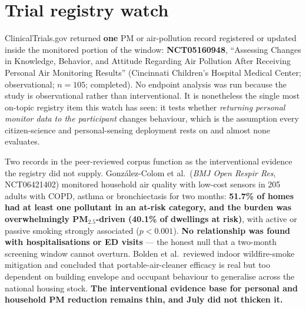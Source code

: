 \documentclass[10pt]{article}
\begin{document}
\clearpage

\section*{\sffamily\bfseries\color{Deep}Trial registry watch}
\vspace{-1.5mm}{\color{Coral}\rule{\linewidth}{1.1pt}}\vspace{2.5mm}

\footnotesize
ClinicalTrials.gov returned \textbf{one} PM or air-pollution record registered or
updated inside the monitored portion of the window: \textbf{NCT05160948}, ``Assessing
Changes in Knowledge, Behavior, and Attitude Regarding Air Pollution After Receiving
Personal Air Monitoring Results'' (Cincinnati Children's Hospital Medical Center;
observational; $n = 105$; completed). No endpoint analysis was run because the study is
observational rather than interventional. It is nonetheless the single most
on-topic registry item this watch has seen: it tests whether \emph{returning personal
monitor data to the participant} changes behaviour, which is the assumption every
citizen-science and personal-sensing deployment rests on and almost none evaluates.

\vspace{1.5mm}
Two records in the peer-reviewed corpus function as the interventional evidence the
registry did not supply. Gonz\'alez-Colom et al.\ (\textit{BMJ Open Respir Res},
NCT06421402) monitored household air quality with low-cost sensors in 205 adults with
COPD, asthma or bronchiectasis for two months: \textbf{51.7\% of homes had at least one
pollutant in an at-risk category, and the burden was overwhelmingly PM$_{2.5}$-driven
(40.1\% of dwellings at risk)}, with active or passive smoking strongly associated
($p < 0.001$). \textbf{No relationship was found with hospitalisations or ED visits} ---
the honest null that a two-month screening window cannot overturn. Bolden et al.\
reviewed indoor wildfire-smoke mitigation and concluded that portable-air-cleaner
efficacy is real but too dependent on building envelope and occupant behaviour to
generalise across the national housing stock. \textbf{The interventional evidence base
for personal and household PM reduction remains thin, and July did not thicken it.}

\vspace{4mm}

\end{document}
